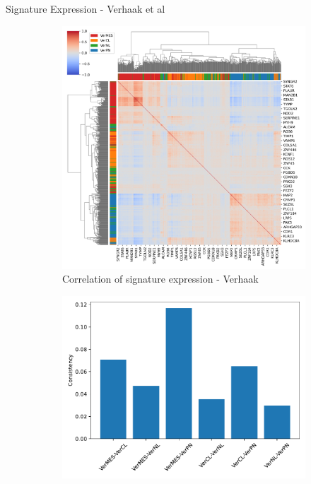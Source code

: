 \documentclass[aspectratio=169,9pt]{beamer}
\begin{document}
    \begin{frame}{Signature Expression - Verhaak et al}
        \begin{adjustwidth}{-5cm}{-5cm}
            \centering
            \begin{figure}\ContinuedFloat
                \centering
                \begin{subfigure}[c]{0.48\textwidth}
                    \centering
                    \includegraphics[width=\textwidth]{GSM3828672_Corrplot_Ver}
                    \caption{Correlation of signature expression - Verhaak}
                \end{subfigure}
                \begin{subfigure}[c]{0.4\textwidth}
                    \centering
                    \includegraphics[width=\textwidth]{GSM3828672_Consistency_Ver}

\end{subfigure}
\end{figure}
\end{adjustwidth}
\end{frame}
\end{document}
